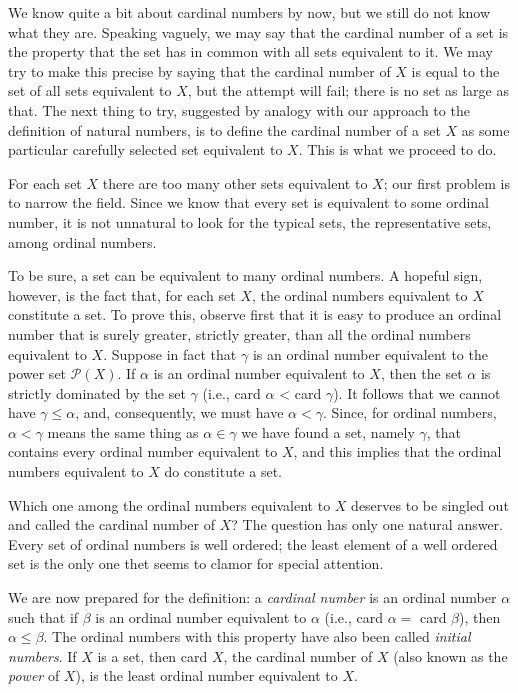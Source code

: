

We know quite a bit about cardinal numbers by now, but we still do not know what they are. Speaking vaguely, we may say that the cardinal number of a set is the property that the set has in common with all sets equivalent to it. We may try to make this precise by saying that the cardinal number of $X$ is equal to the set of all sets equivalent to $X$, but the attempt will fail; there is no set as large as that. The next thing to try, suggested by analogy with our approach to the definition of natural numbers, is to define the cardinal number of a set $X$ as some particular carefully selected set equivalent to $X$. This is what we proceed to do. 

For each set $X$ there are too many other sets equivalent to $X$; our first problem is to narrow the field. Since we know that every set is equivalent to some ordinal number, it is not unnatural to look for the typical sets, the representative sets, among ordinal numbers. 

To be sure, a set can be equivalent to many ordinal numbers. A hopeful sign, however, is the fact that, for each set $X$, the ordinal numbers equivalent to $X$ constitute a set. To prove this, observe first that it is easy to produce an ordinal number that is surely greater, strictly greater, than all the ordinal numbers equivalent to $X$. Suppose in fact that $\gamma$ is an ordinal number equivalent to the power set $\mathcal{P}(X)$. If $\alpha$ is an ordinal number equivalent to $X$, then the set $\alpha$ is strictly dominated by the set $\gamma$ (i.e., card $\alpha$ < card $\gamma$). It follows that we cannot have $\gamma \le \alpha$, and, consequently, we must have $\alpha < \gamma$.  Since, for ordinal numbers, $\alpha < \gamma$ means the same thing as $\alpha \in \gamma$ we have found a set, namely $\gamma$, that contains every ordinal number equivalent to $X$, and this implies that the ordinal numbers equivalent to $X$ do constitute a set. 

Which one among the ordinal numbers equivalent to $X$ deserves to be singled out and called the cardinal number of $X$? The question has only one natural answer. Every set of ordinal numbers is well ordered; the least element of a well ordered set is the only one thet seems to clamor for special attention. 

We are now prepared for the definition: a \textit{cardinal number} is an ordinal number $\alpha$ such that if $\beta$ is an ordinal number equivalent to $\alpha$ (i.e., card $\alpha =$ card $\beta$), then $\alpha \le \beta$. The ordinal numbers with this property have also been called \textit{initial numbers}. If $X$ is a set, then card $X$, the cardinal number of $X$ (also known as the \textit{power} of $X$), is the least ordinal number equivalent to $X$. 

